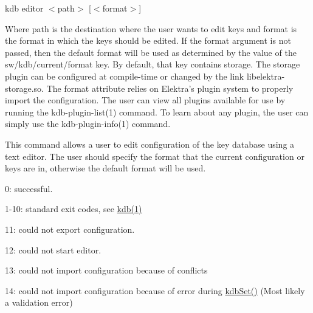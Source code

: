 {\ttfamily kdb editor $<$path$>$ \mbox{[}$<$format$>$\mbox{]}}

Where {\ttfamily path} is the destination where the user wants to edit keys and {\ttfamily format} is the format in which the keys should be edited. If the {\ttfamily format} argument is not passed, then the default format will be used as determined by the value of the {\ttfamily sw/kdb/current/format} key. By default, that key contains {\ttfamily storage}. The {\ttfamily storage} plugin can be configured at compile-\/time or changed by the link {\ttfamily libelektra-\/storage.\+so}. The {\ttfamily format} attribute relies on Elektra’s plugin system to properly import the configuration. The user can view all plugins available for use by running the kdb-\/plugin-\/list(1) command. To learn about any plugin, the user can simply use the kdb-\/plugin-\/info(1) command.

This command allows a user to edit configuration of the key database using a text editor. The user should specify the format that the current configuration or keys are in, otherwise the default format will be used.


\begin{DoxyItemize}
\item 0\+: successful.
\item 1-\/10\+: standard exit codes, see \hyperlink{doc_help_kdb_md}{kdb(1)}
\item 11\+: could not export configuration.
\item 12\+: could not start editor.
\item 13\+: could not import configuration because of conflicts
\item 14\+: could not import configuration because of error during \hyperlink{group__kdb_ga11436b058408f83d303ca5e996832bcf}{kdb\+Set()} (Most likely a validation error)
\end{DoxyItemize}


